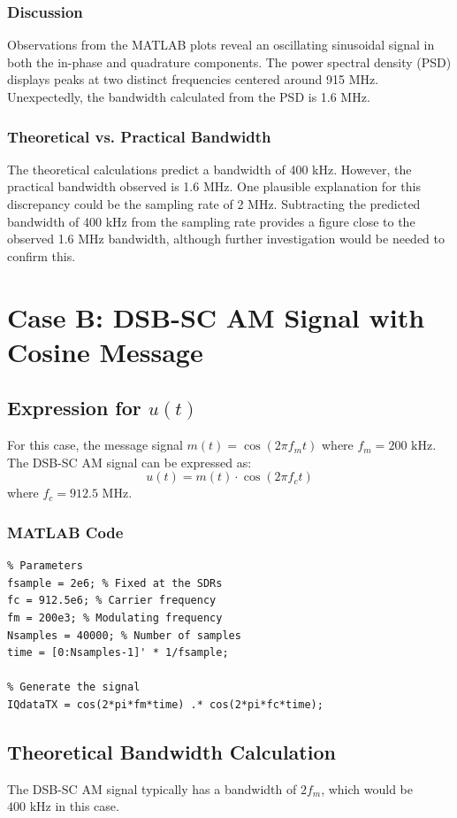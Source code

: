 \documentclass[12pt]{article}
\begin{document}
\subsubsection*{Discussion}
Observations from the MATLAB plots reveal an oscillating sinusoidal signal in both the in-phase and quadrature components. The power spectral density (PSD) displays peaks at two distinct frequencies centered around 915 MHz. Unexpectedly, the bandwidth calculated from the PSD is 1.6 MHz.

\subsubsection*{Theoretical vs. Practical Bandwidth}
The theoretical calculations predict a bandwidth of 400 kHz. However, the practical bandwidth observed is 1.6 MHz. One plausible explanation for this discrepancy could be the sampling rate of 2 MHz. Subtracting the predicted bandwidth of 400 kHz from the sampling rate provides a figure close to the observed 1.6 MHz bandwidth, although further investigation would be needed to confirm this.


\section*{Case B: DSB-SC AM Signal with Cosine Message}
\subsection*{Expression for \(u(t)\)}
For this case, the message signal \(m(t) = \cos(2\pi f_m t)\) where \(f_m = 200 \text{ kHz}\). The DSB-SC AM signal can be expressed as:
\[
u(t) = m(t) \cdot \cos(2\pi f_c t)
\]
where \(f_c = 912.5 \text{ MHz}\).

\subsubsection*{MATLAB Code}
\begin{lstlisting}
% Parameters
fsample = 2e6; % Fixed at the SDRs
fc = 912.5e6; % Carrier frequency
fm = 200e3; % Modulating frequency
Nsamples = 40000; % Number of samples
time = [0:Nsamples-1]' * 1/fsample;

% Generate the signal
IQdataTX = cos(2*pi*fm*time) .* cos(2*pi*fc*time);
\end{lstlisting}

\subsection*{Theoretical Bandwidth Calculation}
The DSB-SC AM signal typically has a bandwidth of \(2f_m\), which would be \(400 \text{ kHz}\) in this case.
\end{document}

